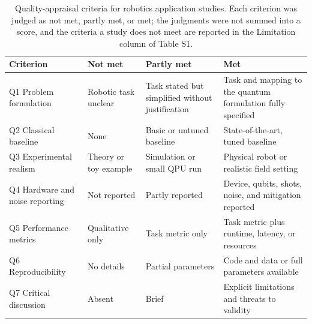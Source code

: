 \documentclass[acmsmall,screen,review]{acmart}
\begin{document}
\begin{table}[h]
\caption{Quality-appraisal criteria for robotics application studies. Each criterion was judged as not met, partly met, or met; the judgments were not summed into a score, and the criteria a study does not meet are reported in the Limitation column of Table S1.}
\label{tab:rubric}
\footnotesize
\begin{tabular}{@{}>{\raggedright\arraybackslash}p{0.250\dimexpr\linewidth-8\tabcolsep\relax}>{\raggedright\arraybackslash}p{0.220\dimexpr\linewidth-8\tabcolsep\relax}>{\raggedright\arraybackslash}p{0.260\dimexpr\linewidth-8\tabcolsep\relax}>{\raggedright\arraybackslash}p{0.270\dimexpr\linewidth-8\tabcolsep\relax}@{}}
\toprule
\textbf{Criterion} & \textbf{Not met} & \textbf{Partly met} & \textbf{Met} \\ \midrule
Q1 Problem formulation & Robotic task unclear & Task stated but simplified without justification & Task and mapping to the quantum formulation fully specified \\
Q2 Classical baseline & None & Basic or untuned baseline & State-of-the-art, tuned baseline \\
Q3 Experimental realism & Theory or toy example & Simulation or small QPU run & Physical robot or realistic field setting \\
Q4 Hardware and noise reporting & Not reported & Partly reported & Device, qubits, shots, noise, and mitigation reported \\
Q5 Performance metrics & Qualitative only & Task metric only & Task metric plus runtime, latency, or resources \\
Q6 Reproducibility & No details & Partial parameters & Code and data or full parameters available \\
Q7 Critical discussion & Absent & Brief & Explicit limitations and threats to validity \\
\bottomrule
\end{tabular}
\end{table}
\end{document}
